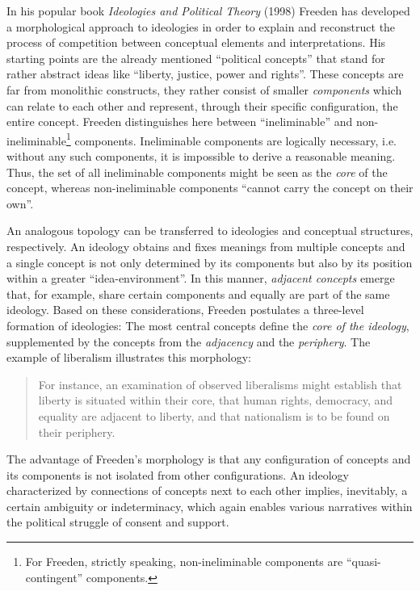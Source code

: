 \documentclass[a4paper]{scrreprt}
\begin{document}
In his popular book {\em Ideologies and Political Theory} (1998) Freeden has developed a morphological approach to ideologies in order to explain and reconstruct the process of competition between conceptual elements and interpretations. His starting points are the already mentioned ``political concepts'' that stand for rather abstract ideas like ``liberty, justice, power and rights''. \cite[p.~54]{freeden:1998} These concepts are far from monolithic constructs, they rather consist of smaller {\em components} which can relate to each other and represent, through their specific configuration, the entire concept. Freeden distinguishes here between ``ineliminable'' and non-ineliminable\footnote{For Freeden, strictly speaking, non-ineliminable components are ``quasi-contingent'' components.} components. Ineliminable components are logically necessary, i.e. without any such components, it is impossible to derive a reasonable meaning. Thus, the set of all ineliminable components might be seen as the {\em core} of the concept, whereas non-ineliminable components ``cannot carry the concept on their own''. \cite[p.~62]{freeden:1998}\par
An analogous topology can be transferred to ideologies and conceptual structures, respectively. An ideology obtains and fixes meanings from multiple concepts and a single concept is not only determined by its components but also by its position within a greater ``idea-environment''. \cite[p.~67]{freeden:1998} In this manner, {\em adjacent concepts} emerge that, for example, share certain components and equally are part of the same ideology. Based on these considerations, Freeden postulates a three-level formation of ideologies: The most central concepts define the {\em core of the ideology}, supplemented by the concepts from the {\em adjacency} and the {\em periphery}. The example of liberalism illustrates this morphology:
\begin{quote}
    For instance, an examination of observed liberalisms might establish that liberty is situated within their core, that human rights, democracy, and equality are adjacent to liberty, and that nationalism is to be found on their periphery. \cite[p.~77]{freeden:1998}
\end{quote}
The advantage of Freeden’s morphology is that any configuration of concepts and its components is not isolated from other configurations. An ideology characterized by connections of concepts next to each other implies, inevitably, a certain ambiguity or indeterminacy, which again enables various narratives within the political struggle of consent and support. \cite[p.~155]{lembcke:2014}
\end{document}
